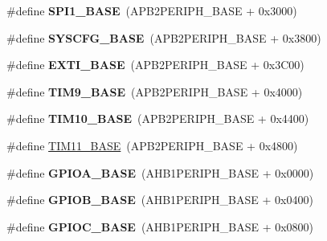 \begin{DoxyCompactItemize}
\mbox{\label{group___peripheral__memory__map_ga50cd8b47929f18b05efbd0f41253bf8d}} 
\#define {\bfseries S\+P\+I1\+\_\+\+B\+A\+SE}~(A\+P\+B2\+P\+E\+R\+I\+P\+H\+\_\+\+B\+A\+SE + 0x3000)
\item 
\mbox{\label{group___peripheral__memory__map_ga62246020bf3b34b6a4d8d0e84ec79d3d}} 
\#define {\bfseries S\+Y\+S\+C\+F\+G\+\_\+\+B\+A\+SE}~(A\+P\+B2\+P\+E\+R\+I\+P\+H\+\_\+\+B\+A\+SE + 0x3800)
\item 
\mbox{\label{group___peripheral__memory__map_ga87371508b3bcdcd98cd1ec629be29061}} 
\#define {\bfseries E\+X\+T\+I\+\_\+\+B\+A\+SE}~(A\+P\+B2\+P\+E\+R\+I\+P\+H\+\_\+\+B\+A\+SE + 0x3\+C00)
\item 
\mbox{\label{group___peripheral__memory__map_ga92ae902be7902560939223dd765ece08}} 
\#define {\bfseries T\+I\+M9\+\_\+\+B\+A\+SE}~(A\+P\+B2\+P\+E\+R\+I\+P\+H\+\_\+\+B\+A\+SE + 0x4000)
\item 
\mbox{\label{group___peripheral__memory__map_ga3eff32f3801db31fb4b61d5618cad54a}} 
\#define {\bfseries T\+I\+M10\+\_\+\+B\+A\+SE}~(A\+P\+B2\+P\+E\+R\+I\+P\+H\+\_\+\+B\+A\+SE + 0x4400)
\item 
\#define \hyperlink{group___peripheral__memory__map_ga3a4a06bb84c703084f0509e105ffaf1d}{T\+I\+M11\+\_\+\+B\+A\+SE}~(A\+P\+B2\+P\+E\+R\+I\+P\+H\+\_\+\+B\+A\+SE + 0x4800)
\item 
\mbox{\label{group___peripheral__memory__map_gad7723846cc5db8e43a44d78cf21f6efa}} 
\#define {\bfseries G\+P\+I\+O\+A\+\_\+\+B\+A\+SE}~(A\+H\+B1\+P\+E\+R\+I\+P\+H\+\_\+\+B\+A\+SE + 0x0000)
\item 
\mbox{\label{group___peripheral__memory__map_gac944a89eb789000ece920c0f89cb6a68}} 
\#define {\bfseries G\+P\+I\+O\+B\+\_\+\+B\+A\+SE}~(A\+H\+B1\+P\+E\+R\+I\+P\+H\+\_\+\+B\+A\+SE + 0x0400)
\item 
\mbox{\label{group___peripheral__memory__map_ga26f267dc35338eef219544c51f1e6b3f}} 
\#define {\bfseries G\+P\+I\+O\+C\+\_\+\+B\+A\+SE}~(A\+H\+B1\+P\+E\+R\+I\+P\+H\+\_\+\+B\+A\+SE + 0x0800)

\end{DoxyCompactItemize}
